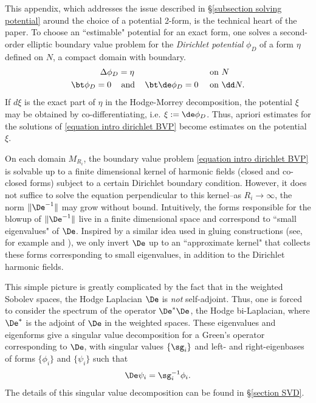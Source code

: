 \documentclass[hidelinks, 12pt, oneside, reqno]{amsart}
\begin{document}
This appendix, which addresses the issue described in \S \ref{subsection solving potential} around the choice of a potential 2-form, is the technical heart of the paper.  To choose an ``estimable" potential for an exact form, one solves a second-order elliptic boundary value problem for the \textit{Dirichlet potential} $\phi_D$ of a form $\eta$ defined on $N$, a compact domain with boundary. 
\begin{align}\label{equation intro dirichlet BVP}
    \begin{aligned}
    \Delta \phi_D &= \eta \\
    \bt \phi_D = 0 \;\;\;&\text{ and }\;\;\; \bt \de \phi_D = 0
    \end{aligned}
    &&
    \begin{aligned}
        &\text{ on }N\\
     &\text{ on }\dd N. 
    \end{aligned}
\end{align}
If $d\xi$ is the exact part of $\eta$ in the Hodge-Morrey decomposition, the potential $\xi$ may be obtained by co-differentiating, i.e. $\xi := \de \phi_D$. Thus, apriori estimates for the solutions of \eqref{equation intro dirichlet BVP} become estimates on the potential $\xi$. 

On each domain $M_{R_i}$, the boundary value problem \eqref{equation intro dirichlet BVP} is solvable up to a finite dimensional kernel of harmonic fields (closed and co-closed forms) subject to a certain Dirichlet boundary condition. However, it does not suffice to solve the equation perpendicular to this kernel--as $R_i \rightarrow \infty$, the norm $\|\De^{-1}\|$ may grow without bound. Intuitively, the forms responsible for the blowup of $\|\De^{-1}\|$ live in a finite dimensional space and correspond to ``small eigenvalues" of $\De$. Inspired by a similar idea used in gluing constructions (see, for example \cite{KapouleasCMC1} and \cite{BreinerKapouleasCMC1}), we only invert $\De$ up to an ``approximate kernel" that collects these forms corresponding to small eigenvalues, in addition to the Dirichlet harmonic fields. 

This simple picture is greatly complicated by the fact that in the weighted Sobolev spaces, the Hodge Laplacian $\De$ is \textit{not} self-adjoint. Thus, one is forced to consider the spectrum of the operator $\De^*\De$, the Hodge bi-Laplacian, where $\De^*$ is the adjoint of $\De$ in the weighted spaces. These eigenvalues and eigenforms give a singular value decomposition for a Green's operator corresponding to $\De$, with singular values $\{\sg_i\}$ and left- and right-eigenbases of forms $\{\phi_i\}$ and $\{\psi_i\}$ such that 
\[
\De \psi_i = \sg_i^{-1} \phi_i. 
\]
The details of this singular value decomposition can be found in \S \ref{section SVD}. 
\end{document}

